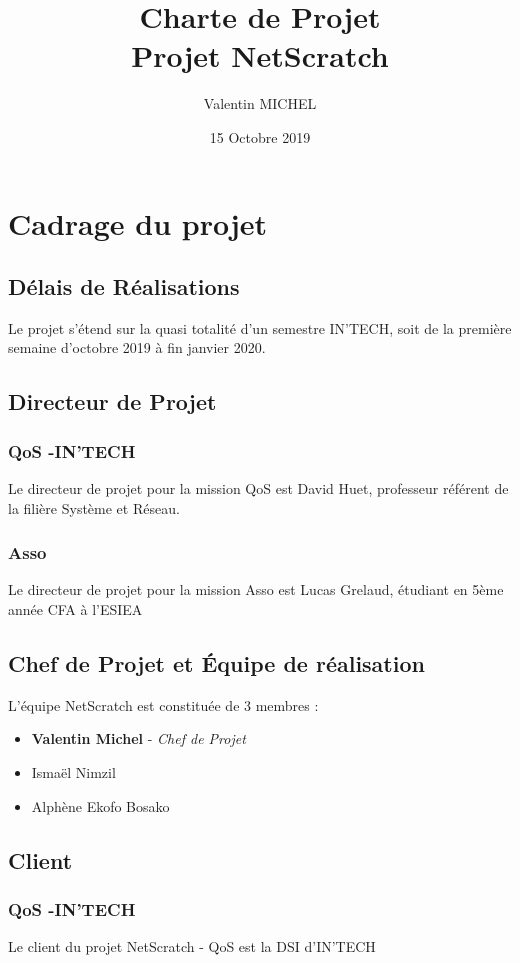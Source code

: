 \documentclass[14pt,a4paper]{extarticle}
\author{Valentin MICHEL}
\date{15 Octobre 2019}
\title{Charte de Projet \\ Projet NetScratch}
\begin{document}
\maketitle{}
\justify
\break
\tableofcontents
\break
\section{Cadrage du projet}
\subsection{Délais de Réalisations}
Le projet s'étend sur la quasi totalité d'un semestre IN'TECH, soit de la première semaine d'octobre 2019 à fin janvier 2020.

\subsection{Directeur de Projet}
\subsubsection{QoS -IN'TECH}
Le directeur de projet pour la mission QoS est David Huet, professeur référent de la filière Système et Réseau.
\subsubsection{Asso}
Le directeur de projet pour la mission Asso est Lucas Grelaud, étudiant en 5ème année CFA à l'ESIEA

\break
\subsection{Chef de Projet et Équipe de réalisation}
L'équipe NetScratch est constituée de 3 membres :
\begin{itemize}
    \item{\textbf{Valentin Michel} - \textit{Chef de Projet}}
    \item{Ismaël Nimzil}
    \item{Alphène Ekofo Bosako}
\end{itemize}

\subsection{Client}
\subsubsection{QoS -IN'TECH}
Le client du projet NetScratch - QoS est la DSI d'IN'TECH
\end{document}
